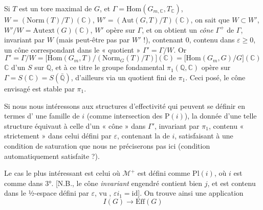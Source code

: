 \documentclass[11pt,a4paper]{article}
\begin{document}
Si $T$ est un tore maximal de $G$, et
$\Gamma = \mathrm{Hom}(G_{m,\mathbb{C}}, T_{\mathbb{C}})$,
$W = (\mathrm{Norm}(T)/T)(\mathbb{C})$,
$W' = (\mathrm{Aut}(G, T)/T)(\mathbb{C})$, on sait que $W \subset W'$,
$W'/W = \mathrm{Autext}(G)(\mathbb{C})$, $W'$ opère sur $\Gamma$, et on
obtient un \emph{cône} \struck{\ill{}} $\Gamma^{+}$ de $\Gamma$, invariant
par $W$ (mais peut-être pas par $W'$ !), contenant $0$, contenu dans
 $\varepsilon \geq 0$,  un cône
correspondant dans le « quotient » $\Gamma' = \Gamma/W$. Or
\[
  \Gamma' = \Gamma/W
  = \bigl[\mathrm{Hom}(G_{m}, T)/(\mathrm{Norm}_{G}(T)/T)\bigr](\mathbb{C})
  = \bigl[\mathrm{Hom}(G_{m}, G)/G\bigr](\mathbb{C})
\]
  
$\mathbb{C}$ d'un  \struck{\ill{}} $S$ \ill{} sur
$\mathbb{Q}$, et à ce titre le groupe fondamental
$\pi_{1}(\mathbb{Q}, \mathbb{C})$ opère sur \struck{\ill{}}
$\Gamma = S(\mathbb{C}) = S(\bar{\mathbb{Q}})$, d'ailleurs via un quotient
fini de $\pi_{1}$. Ceci posé, le cône envisagé  est stable
par $\pi_{1}$.


Si nous nous intéressons aux structures d'effectivité qui peuvent se
définir  en termes d'\struck{\ill{}} une famille de $i$ (comme
intersection des $\mathrm{P}(i)$), \struck{\ill{}} la donnée d'une telle
structure équivaut à celle d'un « cône » dans $\Gamma'$, invariant par
$\pi_{1}$, contenu « strictement » dans celui défini par $\varepsilon$,
contenant la  de $i$, satisfaisant à une condition de
\struck{\ill{}} saturation que nous ne préciserons pas ici (condition
automatiquement satisfaite ?).

Le cas le plus intéressant est celui où $\mathcal{M}^{+}$ \struck{$\otimes$}
est défini comme $\mathrm{Pl}(i)$, où $i$ est comme dans 3°.
\struck{(\ill{})} [N.B., le cône \emph{invariant} engendré contient bien
$j$, et est contenu dans le ½-espace défini par $\varepsilon$, vu \ill{},
$\varepsilon i_{1} = \mathrm{id}$]. On trouve ainsi une application
\[
  I(G) \longrightarrow \mathrm{Eff}(G)
\]
\end{document}

